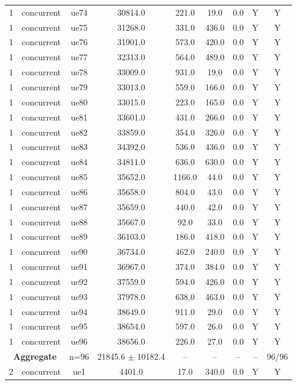 \begin{table}[ht]
\begin{tabular}{|c|c|c|c|c|c|c|c|c|}
1 & concurrent & ue74 & 30814.0 & 221.0 & 19.0 & 0.0 & Y & Y \\
1 & concurrent & ue75 & 31268.0 & 331.0 & 436.0 & 0.0 & Y & Y \\
1 & concurrent & ue76 & 31901.0 & 573.0 & 420.0 & 0.0 & Y & Y \\
1 & concurrent & ue77 & 32313.0 & 564.0 & 489.0 & 0.0 & Y & Y \\
1 & concurrent & ue78 & 33009.0 & 931.0 & 19.0 & 0.0 & Y & Y \\
1 & concurrent & ue79 & 33013.0 & 559.0 & 166.0 & 0.0 & Y & Y \\
1 & concurrent & ue80 & 33015.0 & 223.0 & 165.0 & 0.0 & Y & Y \\
1 & concurrent & ue81 & 33601.0 & 431.0 & 266.0 & 0.0 & Y & Y \\
1 & concurrent & ue82 & 33859.0 & 354.0 & 326.0 & 0.0 & Y & Y \\
1 & concurrent & ue83 & 34392.0 & 536.0 & 436.0 & 0.0 & Y & Y \\
1 & concurrent & ue84 & 34811.0 & 636.0 & 630.0 & 0.0 & Y & Y \\
1 & concurrent & ue85 & 35652.0 & 1166.0 & 44.0 & 0.0 & Y & Y \\
1 & concurrent & ue86 & 35658.0 & 804.0 & 43.0 & 0.0 & Y & Y \\
1 & concurrent & ue87 & 35659.0 & 440.0 & 42.0 & 0.0 & Y & Y \\
1 & concurrent & ue88 & 35667.0 & 92.0 & 33.0 & 0.0 & Y & Y \\
1 & concurrent & ue89 & 36103.0 & 186.0 & 418.0 & 0.0 & Y & Y \\
1 & concurrent & ue90 & 36734.0 & 462.0 & 240.0 & 0.0 & Y & Y \\
1 & concurrent & ue91 & 36967.0 & 374.0 & 384.0 & 0.0 & Y & Y \\
1 & concurrent & ue92 & 37559.0 & 594.0 & 426.0 & 0.0 & Y & Y \\
1 & concurrent & ue93 & 37978.0 & 638.0 & 463.0 & 0.0 & Y & Y \\
1 & concurrent & ue94 & 38649.0 & 911.0 & 29.0 & 0.0 & Y & Y \\
1 & concurrent & ue95 & 38654.0 & 597.0 & 26.0 & 0.0 & Y & Y \\
1 & concurrent & ue96 & 38656.0 & 226.0 & 27.0 & 0.0 & Y & Y \\
\multicolumn{2}{|c|}{\textbf{Aggregate}} & n=96 & 21845.6 $\pm$ 10182.4 & -- & -- & -- & -- & 96/96 \\
\hline
2 & concurrent & ue1 & 4401.0 & 17.0 & 340.0 & 0.0 & Y & Y \\

\end{tabular}
\end{table}
